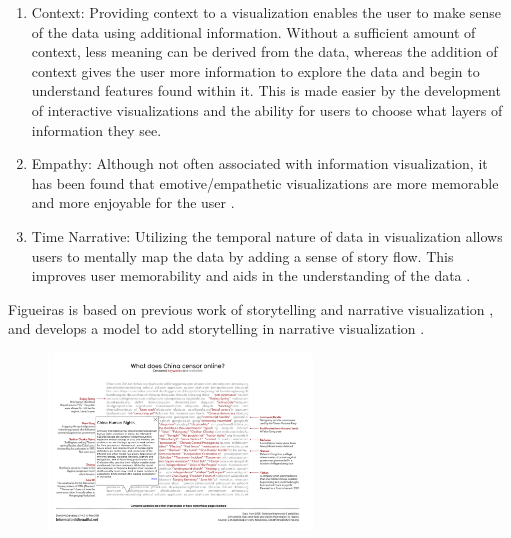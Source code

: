 \documentclass{egpubl}
\begin{document}
\begin{enumerate}
		
	\item Context: Providing context to a visualization enables the user to make sense of the data using additional information. Without a sufficient amount of context, less meaning can be derived from the data, whereas the addition of context gives the user more information to explore the data and begin to understand features found within it. This is made easier by the development of interactive visualizations and the ability for users to choose what layers of information they see. 
		
	\item Empathy: Although not often associated with information visualization, it has been found that emotive/empathetic visualizations are more memorable and more enjoyable for the user \cite{Kosara}.
		
	\item Time Narrative: Utilizing the temporal nature of data in visualization allows users to mentally map the data by adding a sense of story flow. This improves user memorability and aids in the understanding of the data \cite{Kosara}.
		
\end{enumerate}
Figueiras is based on previous work of storytelling \cite{hullman}\cite{sci}\cite{segal} and narrative visualization \cite{fisher}, and develops a model to add storytelling in narrative visualization \cite{figueiras}.

\begin{figure}
\begingroup
\centering
\includegraphics[width=7cm]{./images/figueiras14narrative}
\label{fig:figueiras14narrative}
\endgroup
\end{figure}
\end{document}
